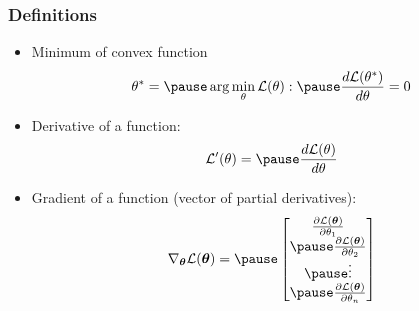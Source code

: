 \documentclass[smaller]{beamer}
\newcommand{\?}{\stackrel{?}{=}}
\newcommand{\fr}{\frac}
\newcommand{\pd}[2]{\frac{\partial{#1}}{\partial{#2}}}
\renewcommand{\th}{\theta}
\newcommand{\mc}{\mathcal}
\begin{document}
\begin{frame}
  \frametitle{Definitions} \pause

  \begin{itemize}[<+->]
    \item Minimum of convex function \pause
  \begin{equation}
    \th^{*} = \pause \arg\min_{\th} \mc{L}(\th): \pause \fr{d \mc{L}(\th^{*})}{d\th} = 0
  \end{equation}

  \pause
  
  \item Derivative of a function: \pause
    \begin{equation}
      \mc{L}'(\th) = \pause \fr{d \mc{L}(\th)}{d\th}
    \end{equation}
    \pause
  \item Gradient of a function \pause (vector of partial derivatives): \pause
    \begin{equation}
      \nabla_{\bm\th} \mc{L}(\bm \th) = \pause
      \begin{bmatrix}
        \pd{\mc{L}(\bm \th)}{\th_{1}} \\ \pause
        \pd{\mc{L}(\bm \th)}{\th_{2}} \\\pause
        \vdots \\\pause
        \pd{\mc{L}(\bm \th)}{\th_{n}} \\        
      \end{bmatrix}
    \end{equation}
     \end{itemize}

\end{frame}
\end{document}
